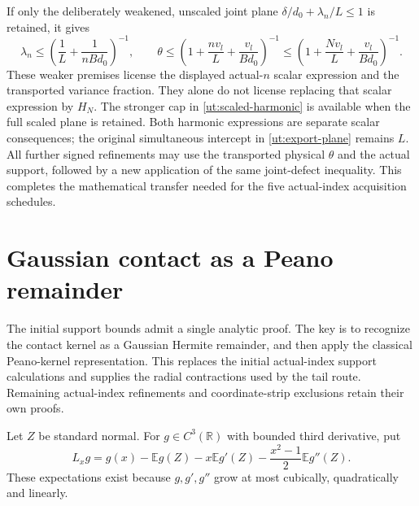 \documentclass[aop,preprint]{imsart}
\theoremstyle{definition}
\newcommand{\E}{\mathbb E}
\numberwithin{equation}{section}
\begin{document}
If only the deliberately weakened, unscaled joint plane
$\delta/d_0+\lambda_n/L\le1$ is retained, it gives
\[
 \lambda_n\le\left(\frac1L+\frac1{nBd_0}\right)^{-1},\qquad
 \theta\le\left(1+\frac{nv_l}{L}
                         +\frac{v_l}{Bd_0}\right)^{-1}
 \le\left(1+\frac{Nv_l}{L}
                         +\frac{v_l}{Bd_0}\right)^{-1}.
\]
These weaker premises license the displayed actual-$n$
scalar expression and the transported variance fraction. They alone
do not license replacing that scalar expression by $H_N$.
The stronger cap in \eqref{ut:scaled-harmonic} is available when the
full scaled plane is retained. Both harmonic expressions are separate
scalar consequences; the original simultaneous intercept in
\eqref{ut:export-plane} remains $L$.
All further signed refinements may use the transported physical
$\theta$ and the actual support, followed by a new application of
the same joint-defect inequality. This completes the mathematical
transfer needed for the five actual-index acquisition schedules.


\section{Gaussian contact as a Peano remainder}\label{gc:section}

The initial support bounds admit a single analytic proof. The key is to
recognize the contact kernel as a Gaussian Hermite remainder, and then
apply the classical Peano-kernel representation. This replaces the
initial actual-index support calculations and supplies the radial
contractions used by the tail route. Remaining actual-index refinements
and coordinate-strip exclusions retain their own proofs.

Let $Z$ be standard normal. For $g\in C^3(\mathbb R)$ with bounded
third derivative, put
\[
 L_xg=g(x)-\E g(Z)-x\E g'(Z)-\frac{x^2-1}{2}\E g''(Z).
\]
These expectations exist because $g,g',g''$ grow at most cubically,
quadratically and linearly.
\end{document}
